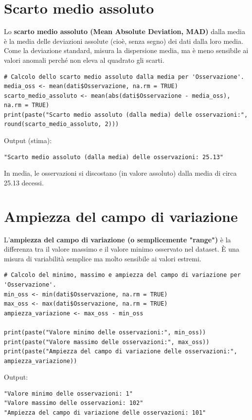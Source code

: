 \documentclass[14pt, openany, titlepage]{report} %
\begin{document}
\section{Scarto medio assoluto}
Lo \textbf{scarto medio assoluto (Mean Absolute Deviation, MAD)}
 dalla media è la media delle deviazioni assolute (cioè, senza segno)
  dei dati dalla loro media. Come la deviazione standard, 
  misura la dispersione media, ma è meno sensibile ai valori 
  anomali perché non eleva al quadrato gli scarti.
\begin{center}
\begin{lstlisting}[breaklines=true]
# Calcolo dello scarto medio assoluto dalla media per 'Osservazione'.
media_oss <- mean(dati$Osservazione, na.rm = TRUE)
scarto_medio_assoluto <- mean(abs(dati$Osservazione - media_oss), na.rm = TRUE)
print(paste("Scarto medio assoluto (dalla media) delle osservazioni:", round(scarto_medio_assoluto, 2)))
\end{lstlisting}
\end{center}
\noindent
Output (stima):
\begin{verbatim}
"Scarto medio assoluto (dalla media) delle osservazioni: 25.13"
\end{verbatim}
In media, le osservazioni si discostano (in valore assoluto) 
dalla media di circa 25.13 decessi.

\section{Ampiezza del campo di variazione}
L'\textbf{ampiezza del campo di variazione (o semplicemente "range")} 
è la differenza tra il valore massimo e il valore minimo osservato 
nel dataset. È una misura di variabilità semplice ma molto sensibile 
ai valori estremi.
\newpage
\begin{center}
\begin{lstlisting}[breaklines=true]
# Calcolo del minimo, massimo e ampiezza del campo di variazione per 'Osservazione'.
min_oss <- min(dati$Osservazione, na.rm = TRUE)
max_oss <- max(dati$Osservazione, na.rm = TRUE)
ampiezza_variazione <- max_oss - min_oss 

print(paste("Valore minimo delle osservazioni:", min_oss))
print(paste("Valore massimo delle osservazioni:", max_oss))
print(paste("Ampiezza del campo di variazione delle osservazioni:", ampiezza_variazione))
\end{lstlisting}
\end{center}
\noindent
Output:
\begin{verbatim}
"Valore minimo delle osservazioni: 1" 
"Valore massimo delle osservazioni: 102" 
"Ampiezza del campo di variazione delle osservazioni: 101"
\end{verbatim}
\end{document}
